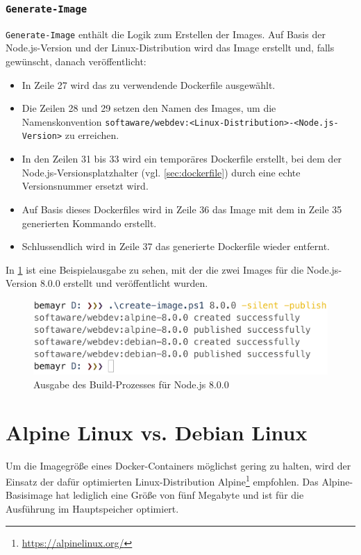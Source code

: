 \subsubsection{\texttt{Generate-Image}}
\verb|Generate-Image| enthält die Logik zum Erstellen der Images.
Auf Basis der Node.js-Version und der Linux-Distribution wird das Image erstellt und, falls gewünscht, danach veröffentlicht:
\begin{itemize}
    \item In Zeile 27 wird das zu verwendende Dockerfile ausgewählt.
    \item Die Zeilen 28 und 29 setzen den Namen des Images, um die Namenskonvention \verb|softaware/webdev:<Linux-Distribution>-<Node.js-Version>| zu erreichen.
    \item In den Zeilen 31 bis 33 wird ein temporäres Dockerfile erstellt, bei dem der Node.js-Versionsplatzhalter (vgl. \cref{sec:dockerfile}) durch eine echte Versionsnummer ersetzt wird.
    \item Auf Basis dieses Dockerfiles wird in Zeile 36 das Image mit dem in Zeile 35 generierten Kommando erstellt.
    \item Schlussendlich wird in Zeile 37 das generierte Dockerfile wieder entfernt.
\end{itemize}
In \cref{fig:create-image} ist eine Beispielausgabe zu sehen, mit der die zwei Images für die Node.js-Version 8.0.0 erstellt und veröffentlicht wurden.
\begin{figure}[htbp]
    \centering
    \includegraphics[width=0.75\linewidth,clip]{images/create-image}
    \caption{Ausgabe des Build-Prozesses für Node.js 8.0.0}
\label{fig:create-image}
\end{figure}

\section{Alpine Linux vs. Debian Linux}
\label{sec:alpine-vs-debian}
Um die Imagegröße eines Docker-Containers möglichst gering zu halten, wird der Einsatz der dafür optimierten Linux-Distribution Alpine\footnote{\url{https://alpinelinux.org/}} empfohlen.
Das Alpine-Basisimage hat lediglich eine Größe von fünf Megabyte und ist für die Ausführung im Hauptspeicher optimiert.

